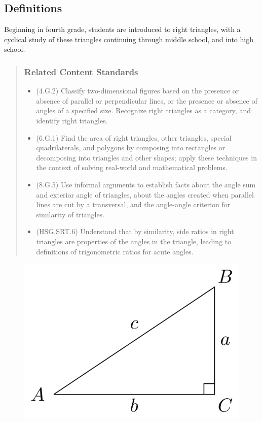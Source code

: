 \documentclass[
]{book}
\providecommand{\tightlist}{%
  \setlength{\itemsep}{0pt}\setlength{\parskip}{0pt}}
\theoremstyle{definition}
\theoremstyle{definition}
\theoremstyle{definition}
\theoremstyle{remark}
\begin{document}
\hypertarget{definitions}{%
\subsection{Definitions}\label{definitions}}

Beginning in fourth grade, students are introduced to right triangles, with a cyclical study of these triangles continuing through middle school, and into high school.

\begin{quote}
\hypertarget{related-content-standards-53}{%
\subsubsection*{Related Content Standards}\label{related-content-standards-53}}

\begin{itemize}
\tightlist
\item
  (4.G.2) Classify two-dimensional figures based on the presence or absence of parallel or perpendicular lines, or the presence or absence of angles of a specified size. Recognize right triangles as a category, and identify right triangles.
\item
  (6.G.1) Find the area of right triangles, other triangles, special quadrilaterals, and polygons by composing into rectangles or decomposing into triangles and other shapes; apply these techniques in the context of solving real-world and mathematical problems.
\item
  (8.G.5) Use informal arguments to establish facts about the angle sum and exterior angle of triangles, about the angles created when parallel lines are cut by a transversal, and the angle-angle criterion for similarity of triangles.
\item
  (HSG.SRT.6) Understand that by similarity, side ratios in right triangles are properties of the angles in the triangle, leading to definitions of trigonometric ratios for acute angles.
\end{itemize}
\end{quote}

\begin{figure}

{\centering \includegraphics[width=0.3\linewidth]{tikz/right-triangle-trig} 

}

\end{figure}
\end{document}
